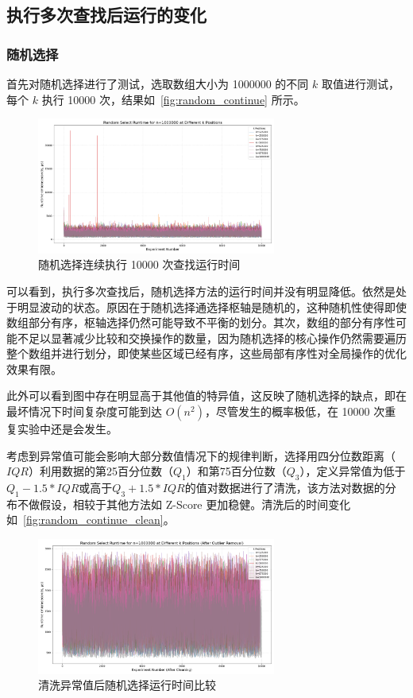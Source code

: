 \subsection{执行多次查找后运行的变化}

\subsubsection{随机选择}

首先对随机选择进行了测试，选取数组大小为 1000000 的不同 $k$ 取值进行测试，每个 $k$ 执行 10000 次，结果如~\autoref{fig:random_continue} 所示。\begin{figure}[htbp]
    \centering
    \includegraphics[width=0.7\textwidth]{../figure/random_continue.png}
    \caption{随机选择连续执行 10000 次查找运行时间}
    \label{fig:random_continue}
\end{figure}

可以看到，执行多次查找后，随机选择方法的运行时间并没有明显降低。依然是处于明显波动的状态。原因在于随机选择通选择枢轴是随机的，这种随机性使得即使数组部分有序，枢轴选择仍然可能导致不平衡的划分。其次，数组的部分有序性可能不足以显著减少比较和交换操作的数量，因为随机选择的核心操作仍然需要遍历整个数组并进行划分，即使某些区域已经有序，这些局部有序性对全局操作的优化效果有限。

此外可以看到图中存在明显高于其他值的特异值，这反映了随机选择的缺点，即在最坏情况下时间复杂度可能到达 $O(n^2)$，尽管发生的概率极低，在 10000 次重复实验中还是会发生。

考虑到异常值可能会影响大部分数值情况下的规律判断，选择用四分位数距离（$IQR$）利用数据的第25百分位数（$Q_1$）和第75百分位数（$Q_3$），定义异常值为低于$Q_1 - 1.5 * IQR$或高于$Q_3 + 1.5 * IQR$的值对数据进行了清洗，该方法对数据的分布不做假设，相较于其他方法如 Z-Score 更加稳健。清洗后的时间变化如~\autoref{fig:random_continue_clean}。
\begin{figure}[htbp]
    \centering
    \includegraphics[width=0.7\textwidth]{../figure/random_continue_clean.png}
    \caption{清洗异常值后随机选择运行时间比较}
    \label{fig:random_continue_clean}
\end{figure}

